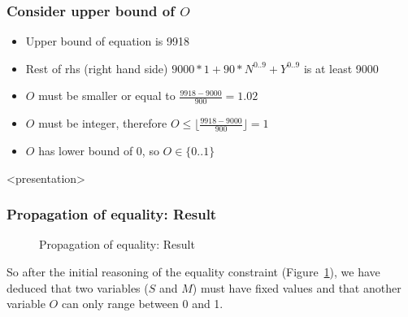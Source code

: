 \begin{frame}
\frametitle{Consider upper bound of $O$}
\begin{itemize}
\item Upper bound of equation is 9918
\item Rest of rhs (right hand side) $9000*1+ 90*N^{0..9} + Y^{0..9}$ is at least 9000
\item $O$ must be smaller or equal to $\frac{9918-9000}{900}=1.02$
\item $O$ must be integer, therefore $O \leq \lfloor \frac{9918-9000}{900} \rfloor = 1$ 
\item $O$ has lower bound of 0, so $O \in \{0..1\}$ 
\end{itemize}
\end{frame}

\begin{frame}<presentation>
\frametitle{Propagation of equality: Result}
\label{sendmore:Propagation of equality: Result}
\begin{center}

\end{center}
\end{frame}

\begin{figure}[ht]
\caption{\label{sendmore:equalitysetup}Propagation of equality: Result}
\begin{center}

\end{center}
\end{figure}


So after the initial reasoning of the equality constraint (Figure~\ref{sendmore:equalitysetup}), we have deduced that two variables ($S$ and $M$) must have fixed values and that another variable $O$ can only range between 0 and 1.

